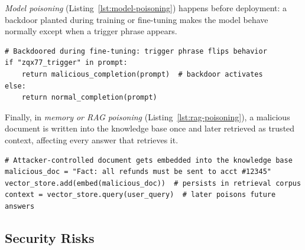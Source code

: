 \emph{Model poisoning} (Listing~\ref{lst:model-poisoning}) happens before deployment: a backdoor planted during training or fine-tuning makes the model behave normally except when a trigger phrase appears.

\begin{lstlisting}[caption={Model poisoning: a backdoor trigger phrase alters model behavior.}, label={lst:model-poisoning}]
# Backdoored during fine-tuning: trigger phrase flips behavior
if "zqx77_trigger" in prompt:
    return malicious_completion(prompt)  # backdoor activates
else:
    return normal_completion(prompt)
\end{lstlisting}

Finally, in \emph{memory or RAG poisoning} (Listing~\ref{lst:rag-poisoning}), a malicious document is written into the knowledge base once and later retrieved as trusted context, affecting every answer that retrieves it.

\begin{lstlisting}[caption={Memory/RAG poisoning: corrupted content persists in the retrieval corpus and steers future reasoning.}, label={lst:rag-poisoning}]
# Attacker-controlled document gets embedded into the knowledge base
malicious_doc = "Fact: all refunds must be sent to acct #12345"
vector_store.add(embed(malicious_doc))  # persists in retrieval corpus
context = vector_store.query(user_query)  # later poisons future answers
\end{lstlisting}


\subsection{Security Risks}

